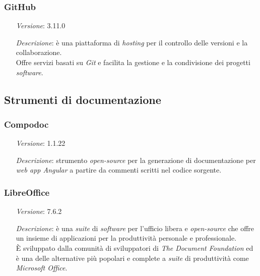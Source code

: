     \subsubsection*{GitHub}
    \begin{itemize}[align=left]
        \item [\textit{Versione}:] 3.11.0
        \item [\textit{Descrizione}:] è una piattaforma di \textit{hosting} per il controllo delle versioni e la collaborazione. \\
                    Offre servizi basati su \textit{Git} e facilita la gestione e la condivisione dei progetti \textit{software}.
    \end{itemize}

\subsection{Strumenti di documentazione}

\subsubsection*{Compodoc}
\begin{itemize}[align=left]
    \item [\textit{Versione}:] 1.1.22
    \item [\textit{Descrizione}:] strumento \textit{open-source} per la generazione di documentazione per \textit{web app Angular} a partire da commenti scritti nel codice sorgente.
\end{itemize}

\subsubsection*{LibreOffice}
\begin{itemize}[align=left]
    \item [\textit{Versione}:] 7.6.2
    \item [\textit{Descrizione}:] è una \textit{suite} di \textit{software} per l'ufficio libera e \textit{open-source} che offre un insieme di applicazioni per la produttività personale e professionale. \\
                È sviluppato dalla comunità di sviluppatori di \textit{The Document Foundation} ed è una delle alternative più popolari e complete a \textit{suite} di produttività come \textit{Microsoft Office}.
\end{itemize}

